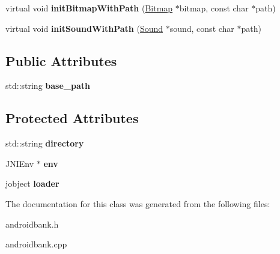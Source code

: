 \begin{DoxyCompactItemize}
\item 
\hypertarget{classg2c_1_1_android_bank_ad8ed7533d1972b303a28b08a16cb80d4}{
virtual void {\bfseries initBitmapWithPath} (\hyperlink{classg2c_1_1_bitmap}{Bitmap} $\ast$bitmap, const char $\ast$path)}
\label{classg2c_1_1_android_bank_ad8ed7533d1972b303a28b08a16cb80d4}

\item 
\hypertarget{classg2c_1_1_android_bank_ac24ccb53727f30900e54015b998a4193}{
virtual void {\bfseries initSoundWithPath} (\hyperlink{classg2c_1_1_sound}{Sound} $\ast$sound, const char $\ast$path)}
\label{classg2c_1_1_android_bank_ac24ccb53727f30900e54015b998a4193}

\end{DoxyCompactItemize}
\subsection*{Public Attributes}
\begin{DoxyCompactItemize}
\item 
\hypertarget{classg2c_1_1_android_bank_a488d92aaa9c083f0d314c297dcf317b6}{
std::string {\bfseries base\_\-path}}
\label{classg2c_1_1_android_bank_a488d92aaa9c083f0d314c297dcf317b6}

\end{DoxyCompactItemize}
\subsection*{Protected Attributes}
\begin{DoxyCompactItemize}
\item 
\hypertarget{classg2c_1_1_android_bank_a27dcff59d476045db2ff67f46d9f276a}{
std::string {\bfseries directory}}
\label{classg2c_1_1_android_bank_a27dcff59d476045db2ff67f46d9f276a}

\item 
\hypertarget{classg2c_1_1_android_bank_afc2bf0d5b0d05401f44e27e4c320c134}{
JNIEnv $\ast$ {\bfseries env}}
\label{classg2c_1_1_android_bank_afc2bf0d5b0d05401f44e27e4c320c134}

\item 
\hypertarget{classg2c_1_1_android_bank_a6e90e2c21a7d6fb61836309c073fdca1}{
jobject {\bfseries loader}}
\label{classg2c_1_1_android_bank_a6e90e2c21a7d6fb61836309c073fdca1}

\end{DoxyCompactItemize}


The documentation for this class was generated from the following files:\begin{DoxyCompactItemize}
\item 
androidbank.h\item 
androidbank.cpp\end{DoxyCompactItemize}
